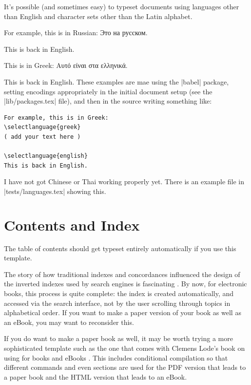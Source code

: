 It's possible (and sometimes easy) to typeset documents using languages other than English
and character sets other than the Latin alphabet.

For example, this is in Russian:
Это на русском.

This is back in English.

This is in Greek:
Αυτό είναι στα ελληνικά.

This is back in English. These examples are mae using the \sverb|babel| package, setting
encodings appropriately in the initial document setup (see the \sverb|lib/packages.tex| file),
and then in the \latex source writing something like:

\begin{Verbatim}[fontsize=\footnotesize]
For example, this is in Greek:
\selectlanguage{greek}
( add your text here )

\selectlanguage{english}
This is back in English.
\end{Verbatim}

I have not got Chinese or Thai working properly yet. There is an example file in \sverb|tests/languages.tex|
showing this.

\section{Contents and Index}

The table of contents should get typeset entirely automatically if you use this template.

The story of how traditional indexes and concordances influenced the design of the inverted
indexes used by search engines is fascinating \citep[Ch 1]{witten1999gigabytes}.
By now, for electronic books, this process is quite complete: the index is created automatically,
and accessed via the search interface, not by the user scrolling through topics in alphabetical order.
If you want to make a paper
version of your book as well as an eBook, you may want to reconsider this.

If you do want to make a paper book as well, it may be worth trying a
more sophisticated template such as the one that comes with Clemens
Lode's book on using \latex for books and eBooks \citep{lode2019better}.
This includes conditional compilation so that different commands and even sections are used
for the PDF version that leads to a paper book and the HTML version that leads to an eBook.

